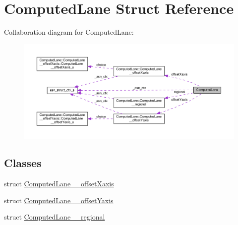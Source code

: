 \hypertarget{structComputedLane}{}\section{Computed\+Lane Struct Reference}
\label{structComputedLane}


Collaboration diagram for Computed\+Lane\+:\nopagebreak
\begin{figure}[H]
\begin{center}
\leavevmode
\includegraphics[width=350pt]{structComputedLane__coll__graph}
\end{center}
\end{figure}
\subsection*{Classes}
\begin{DoxyCompactItemize}
\item 
struct \hyperlink{structComputedLane_1_1ComputedLane____offsetXaxis}{Computed\+Lane\+\_\+\+\_\+offset\+Xaxis}
\item 
struct \hyperlink{structComputedLane_1_1ComputedLane____offsetYaxis}{Computed\+Lane\+\_\+\+\_\+offset\+Yaxis}
\item 
struct \hyperlink{structComputedLane_1_1ComputedLane____regional}{Computed\+Lane\+\_\+\+\_\+regional}
\end{DoxyCompactItemize}
